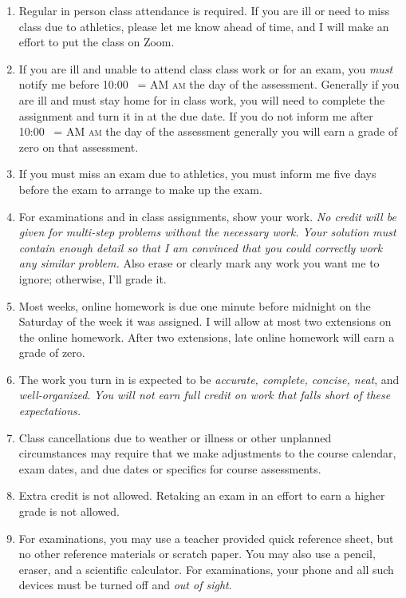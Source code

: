 \documentclass[12pt]{article}
\makeatletter
\newcounter{ex}\setcounter{ex}{0}
\DeclareRobustCommand{\maybefakesc}[1]{%
  \ifnum\pdfstrcmp{\f@series}{\bfdefault}=\z@
    {\fontsize{\dimexpr0.8\dimexpr\f@size pt\relax}{0}\selectfont\uppercase{#1}}%
  \else
    \textsc{#1}%
  \fi
}
\newcommand\AM{\,\maybefakesc{am}\xspace}
\makeatother
\begin{document}
\begin{enumerate}

\item Regular in person class attendance is required. If you are ill or need to miss class due to athletics, please let me know ahead of time, and I will make an effort to put the class on Zoom.

\item If you are ill and unable to attend class class work or for an exam, you \emph{must} notify me before 10:00 \AM the day of the assessment. Generally if you are ill and must stay home for in class work, you will need to complete the assignment and turn it in at the due date. If you do not inform me after 10:00 \AM the day of the assessment generally you will earn a grade of zero on that assessment.

\item If you must miss an exam due to  athletics, you must inform me five days before the exam to arrange to make up the exam. 

\item For examinations and in class assignments, show your work.  \emph{No credit will be given for multi-step problems without the necessary work. Your solution must contain enough detail so that I am convinced that you could correctly work any similar problem.} Also erase or clearly mark any work you want me to ignore; otherwise, I'll grade it.  

\item Most weeks, online homework is due one minute before midnight on the
Saturday of the week it was assigned. I will allow at most two 
extensions on the online homework. After two extensions, late online
homework will earn a grade of zero.

\item The work you turn in is expected to be \emph{accurate,  complete, concise, neat}, and \emph{well-organized}.  
\emph{You will not earn full credit on work that falls short of these expectations.}

\item Class cancellations due to weather or illness or other unplanned circumstances may require that we make  adjustments
to the course calendar, exam dates, and due dates or specifics for course assessments. 

\item Extra credit is not allowed. Retaking an exam in an effort to 
earn a higher grade is not allowed.

\item For examinations, you may use a teacher provided quick reference sheet, but no other reference materials or scratch paper. You may also use a pencil, eraser, and a scientific calculator. For examinations, your phone and all such
devices must be turned off and \emph{out of sight}. 


\end{enumerate}
\end{document}
